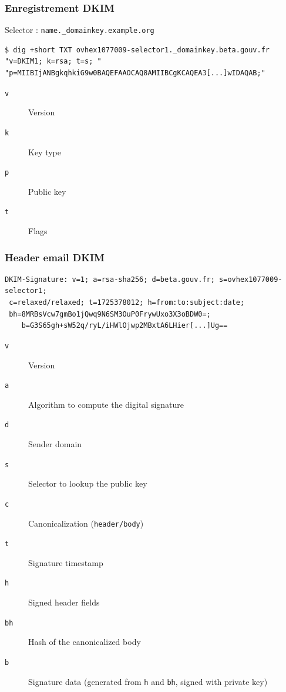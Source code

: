 \documentclass{beamer}
\begin{document}
\begin{frame}[fragile]
    \frametitle{Enregistrement DKIM}

    Selector : \texttt{name.\_domainkey.example.org}

    \begin{verbatim}
$ dig +short TXT ovhex1077009-selector1._domainkey.beta.gouv.fr
"v=DKIM1; k=rsa; t=s; "
"p=MIIBIjANBgkqhkiG9w0BAQEFAAOCAQ8AMIIBCgKCAQEA3[...]wIDAQAB;"
    \end{verbatim}

    \begin{description}
        \item[\texttt{v}] Version
        \item[\texttt{k}] Key type
        \item[\texttt{p}] Public key
        \item[\texttt{t}] Flags
    \end{description}
\end{frame}

\begin{frame}[fragile]
    \frametitle{Header email DKIM}

    \begin{verbatim}
DKIM-Signature: v=1; a=rsa-sha256; d=beta.gouv.fr; s=ovhex1077009-selector1;
 c=relaxed/relaxed; t=1725378012; h=from:to:subject:date;
 bh=8MRBsVcw7gmBo1jQwq9N6SM3OuP0FrywUxo3X3oBDW0=;
    b=G3S65gh+sW52q/ryL/iHWlOjwp2MBxtA6LHier[...]Ug==
    \end{verbatim}

    \begin{description}
        \item[\texttt{v}] Version
        \item[\texttt{a}] Algorithm to compute the digital signature
        \item[\texttt{d}] Sender domain
        \item[\texttt{s}] Selector to lookup the public key
        \item[\texttt{c}] Canonicalization (\texttt{header/body})
        \item[\texttt{t}] Signature timestamp
        \item[\texttt{h}] Signed header fields
        \item[\texttt{bh}] Hash of the canonicalized body
        \item[\texttt{b}] Signature data (generated from \texttt{h} and \texttt{bh}, signed with private key)
    \end{description}
\end{frame}
\end{document}
